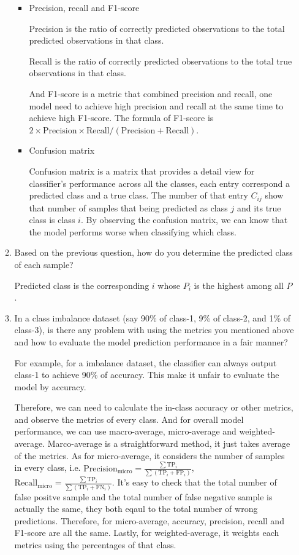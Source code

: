 \documentclass[twocolumn]{extarticle}
\begin{document}
\begin{enumerate}
\begin{enumerate}
\begin{itemize}
\item Precision, recall and F1-score

Precision is the ratio of correctly predicted observations to the total predicted observations in that class. 

Recall is the ratio of correctly predicted observations to the total true observations in that class.

And F1-score is a metric that combined precision and recall, one model need to achieve high precision and recall at the same time to achieve high F1-score. The formula of F1-score is $2 \times \text{Precision} \times \text{Recall} / (\text{Precision} + \text{Recall})$.


\item Confusion matrix

Confusion matrix is a matrix that provides a detail view for classifier's performance across all the classes, each entry correspond a predicted class and a true class. The number of that entry $C_{ij}$ show that number of samples that being predicted as class $j$ and its true class is class $i$. By observing the confusion matrix, we can know that the model performs worse when classifying which class.

\end{itemize}

\item Based on the previous question, how do you determine the predicted class of each sample?

Predicted class is the corresponding $i$ whose $P_i$ is the highest among all $P$.


\item In a class imbalance dataset (say 90\% of class-1, 9\% of class-2, and 1\% of class-3), is there any problem with using the metrics you mentioned above and how to evaluate the model prediction performance in a fair manner?

For example, for a imbalance dataset, the classifier can always output class-1 to achieve 90\% of accuracy. This make it unfair to evaluate the model by accuracy.

Therefore, we can need to calculate the in-class accuracy or other metrics, and observe the metrics of every class. And for overall model performance, we can use macro-average, micro-average and weighted-average. Marco-average is a straightforward method, it just takes average of the metrics. As for micro-average, it considers the number of samples in every class, i.e. $\text{Precision}_{\text{micro}}=\frac{\sum \text{TP}_i}{\sum (\text{TP}_i+\text{FP}_i)}$, $\text{Recall}_{\text{micro}}=\frac{\sum \text{TP}_i}{\sum (\text{TP}_i+\text{FN}_i)}$. It's easy to check that the total number of false positve sample and the total number of false negative sample is actually the same, they both eqaul to the total number of wrong predictions. Therefore, for micro-average, accuracy, precision, recall and F1-score are all the same. Lastly, for weighted-average, it weights each metrics using the percentages of that class.


\end{enumerate}
\end{enumerate}
\end{document}
